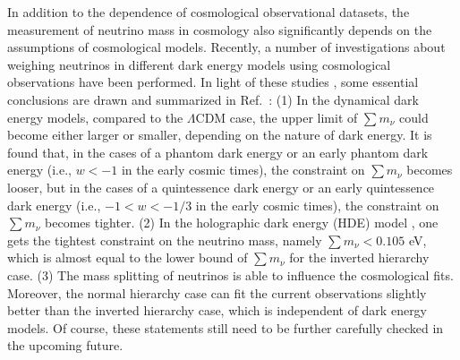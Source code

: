 \documentclass[aps,prd,nofootinbib,amsmath,amssymb,twocolumn,superscriptaddress,10pt]{revtex4}%
\begin{document}
In addition to the dependence of cosmological observational datasets, the measurement of neutrino mass in cosmology also significantly depends on the {assumptions} of cosmological models. Recently, a number of investigations about weighing neutrinos in different dark energy models using cosmological observations have been performed. {In light of these studies \cite{Zhao:2016ecj,Vagnozzi:2018jhn,Zhang:2015uhk,Chen:2015oga,Zhang:2015rha,Zhao:2017urm,Feng:2017mfs}, some essential conclusions are drawn and summarized} in Ref.~\cite{Zhang:2017rbg}: (1) In the dynamical dark energy models, {compared to the $\Lambda$CDM case, the upper limit of $\sum m_\nu$ could become either larger or smaller}, depending on the nature of dark energy. It is found that, in the cases of a phantom dark energy or an early phantom dark energy (i.e., $w<-1$ in the early cosmic times), the constraint on $\sum m_\nu$ becomes looser, but in the cases of a quintessence dark energy or an early quintessence dark energy (i.e., $-1<w<-{1}/{3}$ in the early cosmic times), the constraint on $\sum m_\nu$ becomes tighter. (2) In the holographic dark energy (HDE) model \cite{Li:2004rb,hde2,Zhang:2006qu,Zhang:2005hs,Chang:2005ph,Zhang:2006av,Zhang:2007sh,Zhang:2007an,Zhang:2007es,Ma:2007av,Zhang:2014ija}, one gets the tightest constraint on the neutrino mass, namely $\sum m_\nu<0.105$ eV, which is almost equal to the lower bound of $\sum m_\nu$ for the inverted hierarchy case. (3) The mass splitting of neutrinos {is able to} influence the cosmological fits. Moreover, the normal hierarchy case can fit the current observations slightly better than the inverted hierarchy case, which is independent of dark energy models. Of course, these statements still need to be further carefully checked in the upcoming future.
\end{document}
